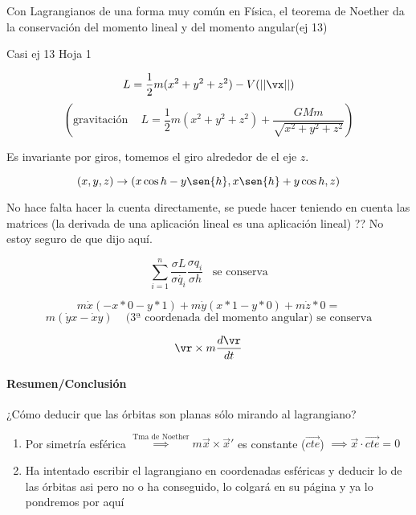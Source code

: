 \begin{obs}

	Con Lagrangianos de una forma muy común en Física, el teorema de Noether da la conservación del momento lineal y del momento angular(ej 13)

\end{obs}


\begin{example}{Casi ej 13 Hoja 1}

$$ L = \frac{1}{2} m (x^2 + y^2 + z^2) - V(||\vx ||)$$
$$(\text{gravitación } \;\;\; L = \frac{1}{2} m (x^2 + y^2 + z^2) + \frac{G M m}{\sqrt{x^2 + y^2 + z^2}})$$

Es invariante por giros, tomemos el giro alrededor de el eje $z$.

$$(x,y,z) \rightarrow (x \cos{h} - y \sen{h}, x \sen{h} + y \cos{h}, z)$$

No hace falta hacer la cuenta directamente, se puede hacer teniendo en cuenta las matrices (la derivada de una aplicación lineal es una aplicación lineal)
?? No estoy seguro de que dijo aquí.

$$\sum_{i=1}^{n} \frac{\sigma L}{\sigma \dot{q_i}} \frac{\sigma q_i}{\sigma h} \;\;\; \text{se conserva}$$

$$m \dot{x} (-x * 0 -y * 1) + m \dot{y} (x * 1 - y * 0) + m \dot{z} * 0 =$$
$$ m (\dot{y}x - \dot{x}y) \;\;\; \text{ (3ª coordenada del momento angular) se conserva}$$

$$\vr \times m \frac{d \vr}{d t}$$

\end{example}


\paragraph{Resumen/Conclusión}
	¿Cómo deducir que las órbitas son planas sólo mirando al lagrangiano?
	\begin{enumerate}
		\item Por simetría esférica $\stackrel{\text{Tma de Noether}}{\implies} m\overrightarrow x \times \overrightarrow x'$ es constante ($\overrightarrow{cte}$) $\implies \overrightarrow x \cdot \overrightarrow{cte} = 0$
		\item Ha intentado escribir el lagrangiano en coordenadas esféricas y deducir lo de las órbitas asi pero no o ha conseguido, lo colgará en su página y ya lo pondremos por aquí
	\end{enumerate}





